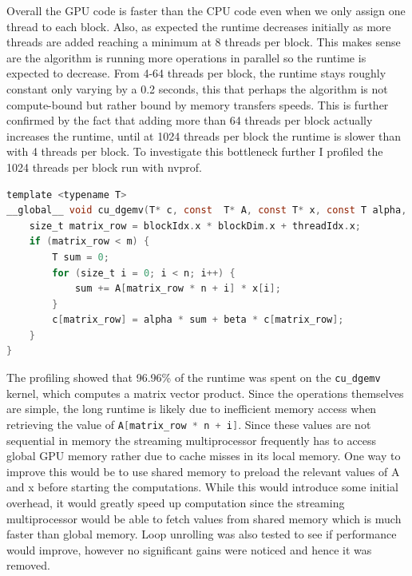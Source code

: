 \FloatBarrier

Overall the GPU code is faster than the CPU code even when we only assign one thread to each block. Also, as expected
the runtime decreases initially as more threads are added reaching a minimum at 8 threads per block. This makes sense
are the algorithm is running more operations in parallel so the runtime is expected to decrease. From 4-64 threads per
block, the runtime stays roughly constant only varying by a 0.2 seconds, this that perhaps the algorithm is not
compute-bound but rather bound by memory transfers speeds. This is further confirmed by the fact that adding more than
64 threads per block actually increases the runtime, until at 1024 threads per block the runtime is slower than with 4
threads per block. To investigate this bottleneck further I profiled the 1024 threads per block run with nvprof.
{
\small
\begin{lstlisting}[language=C]
template <typename T>
__global__ void cu_dgemv(T* c, const  T* A, const T* x, const T alpha, const T beta, size_t m, size_t n){
    size_t matrix_row = blockIdx.x * blockDim.x + threadIdx.x;
    if (matrix_row < m) {
        T sum = 0;
        for (size_t i = 0; i < n; i++) {
            sum += A[matrix_row * n + i] * x[i];
        }
        c[matrix_row] = alpha * sum + beta * c[matrix_row];
    }
} 
\end{lstlisting}
}
The profiling showed that 96.96\% of the runtime was spent on the \lstinline[language=C]|cu_dgemv| kernel, which computes
a matrix vector product. Since the operations themselves are simple, the long runtime is likely due to inefficient
memory access when retrieving the value of \lstinline[language=C]|A[matrix_row * n + i]|. Since these values are not
sequential in memory the streaming multiprocessor frequently has to access global GPU memory rather due to cache misses
in its local memory. One way to improve this would be to use shared memory to preload the relevant values of A and x
before starting the computations. While this would introduce some initial overhead, it would greatly speed up
computation since the streaming multiprocessor would be able to fetch values from shared memory which is much faster
than global memory. Loop unrolling was also tested to see if performance would improve, however no significant gains
were noticed and hence it was removed. 